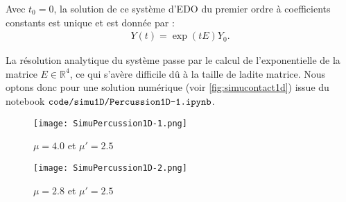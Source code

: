 \noindent Avec $t_0= 0$, la solution de ce système d'EDO du premier ordre à coefficients constants est unique et est donnée par :
\begin{align}
    Y(t) = \exp(tE)Y_0.
\end{align}

La résolution analytique du système passe par le calcul de l'exponentielle de la matrice $E \in \mathbb{R}^4$, ce qui s'avère difficile dû à la taille de ladite matrice. Nous optons donc pour une solution numérique (voir \cref{fig:simucontact1d}) issue du notebook $\verb|code/simu1D/Percussion1D-1.ipynb|$.
\begin{figure*}[!h]
    \centering

    \begin{subfigure}[t]{0.48\textwidth}
        \centering
        \texttt{[image: SimuPercussion1D-1.png]}
        \caption{$\mu= 4.0$ et $\mu' = 2.5$ }
        \label{fig:simucontact1dun}
    \end{subfigure}
    \begin{subfigure}[t]{0.48\textwidth}
        \centering
        \texttt{[image: SimuPercussion1D-2.png]}
        \caption{$\mu= 2.8$ et $\mu' = 2.5$ }
        \label{fig:simucontact1ddeux}
    \end{subfigure}
    \caption{Simulation de la percussion 1D entre deux floes avec $m=1$, $m'=1$, $k=16$, $k'=5$, $v_0=-1.0$, $t_{f}=32$. Dans le premier cas (a), on observe effectivement le ralentissement du système et une convergence
    vers l'état d'équilibre $Y_{eq}= (0,0,0,0)$. Dans le second cas (b), on constate que le système diverge.}
    \label{fig:simucontact1d}
\end{figure*}




